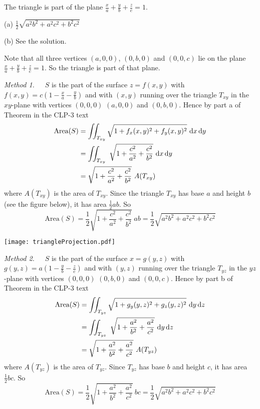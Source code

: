 \begin{hint} 
The triangle is part of the plane $\frac{x}{a}+\frac{y}{b} +\frac{z}{c}=1$.
\end{hint}

\begin{answer} 
(a) $\frac{1}{2}\sqrt{a^2b^2+a^2c^2+b^2c^2}$

(b) See the solution.
\end{answer}

\begin{solution}
Note that all three vertices $(a,0,0)$, $(0,b,0)$ and $(0,0,c)$ lie on 
the plane $\frac{x}{a}+\frac{y}{b} +\frac{z}{c}=1$. So the triangle is 
part of that plane.

\emph{Method 1.}\ \ \ 
 $S$ is the part of the surface $z=f(x,y)$ with 
$f(x,y) = c\left(1-\frac{x}{a}-\frac{y}{b}\right)$
and with $(x,y)$ running over the triangle $T_{xy}$ in the $xy$-plane 
with vertices $(0,0,0)$ $(a,0,0)$ and $(0,b,0)$.
Hence by part a of Theorem  in the CLP-3 text
\begin{align*}
\text{Area}(S)&=\dblInt_{T_{xy}} \sqrt{1+f_x(x,y)^2+f_y(x,y)^2}\ \dee{x}\,\dee{y} \\
&=\dblInt_{T_{xy}}\ \sqrt{1+\frac{c^2}{a^2}+\frac{c^2}{b^2}}\  
\dee{x}\,\dee{y} \\
&=\sqrt{1+\frac{c^2}{a^2}+\frac{c^2}{b^2}}\ A(T_{xy})
\end{align*}
where $A(T_{xy})$ is the area of $T_{xy}$. Since the triangle $T_{xy}$ 
has base $a$ and height $b$ (see the figure below), it has 
area $\frac{1}{2}ab$. So
\begin{equation*}
\text{Area}(S)=\frac{1}{2}\sqrt{1+\frac{c^2}{a^2}+\frac{c^2}{b^2}}\ ab 
 =\frac{1}{2}\sqrt{a^2b^2+a^2c^2+b^2c^2}
\end{equation*}

\begin{center}
     \texttt{[image: triangleProjection.pdf]}
\end{center}


\emph{Method 2.}\ \ \ 
 $S$ is the part of the surface $x=g(y,z)$ with 
$g(y,z) = a\left(1-\frac{y}{b}-\frac{z}{c}\right)$
and with $(y,z)$ running over the triangle $T_{yz}$ in the $yz$-plane 
with vertices $(0,0,0)$ $(0,b,0)$ and $(0,0,c)$.
Hence by part b of Theorem  in the CLP-3 text
\begin{align*}
\text{Area}(S)&=\dblInt_{T_{yz}} \sqrt{1+g_y(y,z)^2+g_z(y,z)^2}\ \dee{y}\,\dee{z} \\
&=\dblInt_{T_{yz}}\ \sqrt{1+\frac{a^2}{b^2}+\frac{a^2}{c^2}}\  
\dee{y}\,\dee{z}\\
&=\sqrt{1+\frac{a^2}{b^2}+\frac{a^2}{c^2}}\ A(T_{yz})
\end{align*}
where $A(T_{yz})$ is the area of $T_{yz}$. Since $T_{yz}$ has base $b$ and 
height $c$, it has area $\frac{1}{2}bc$. So
\begin{equation*}
\text{Area}(S)=\frac{1}{2}\sqrt{1+\frac{a^2}{b^2}+\frac{a^2}{c^2}}\ bc 
 =\frac{1}{2}\sqrt{a^2b^2+a^2c^2+b^2c^2}
\end{equation*}


\end{solution}
